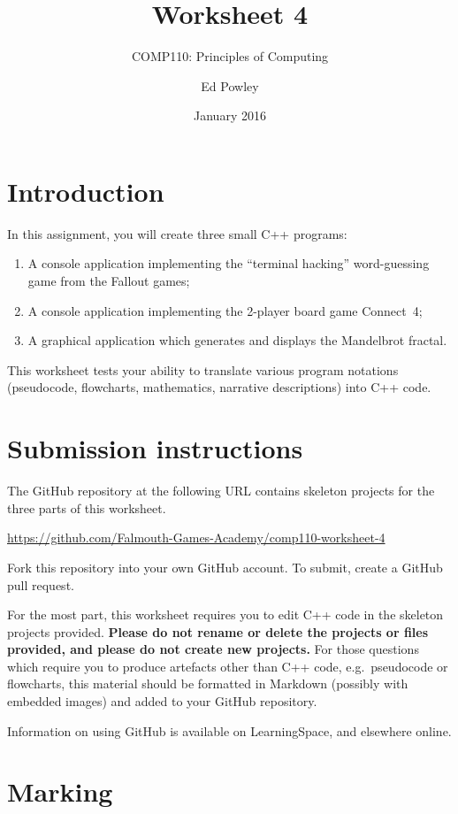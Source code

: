 \documentclass{scrartcl}
\title{Worksheet 4}
\subtitle{COMP110: Principles of Computing}
\author{Ed Powley}
\date{January 2016}
\begin{document}
\maketitle

\section*{Introduction}

In this assignment, you will create three small C++ programs:
\begin{enumerate}[label=\Alph*.]
	\item A console application implementing the ``terminal hacking'' word-guessing game from the Fallout games;
	\item A console application implementing the 2-player board game Connect~4;
	\item A graphical application which generates and displays the Mandelbrot fractal.
\end{enumerate}

This worksheet tests your ability to translate various program notations (pseudocode, flowcharts,
mathematics, narrative descriptions) into C++ code.

\section*{Submission instructions}

The GitHub repository at the following URL contains skeleton projects for the three parts of this worksheet.
\begin{center}
\url{https://github.com/Falmouth-Games-Academy/comp110-worksheet-4}
\end{center}
Fork this repository into your own GitHub account. To submit, create a GitHub pull request.

For the most part, this worksheet requires you to edit C++ code in the skeleton projects provided.
\textbf{Please do not rename or delete the projects or files provided, and please do not create new projects.}
For those questions which require you to produce artefacts other than C++ code, e.g.\ pseudocode or flowcharts,
this material should be formatted in Markdown (possibly with embedded images) and added to your GitHub repository.

Information on using GitHub is available on LearningSpace, and elsewhere online.

\section*{Marking}
\end{document}
